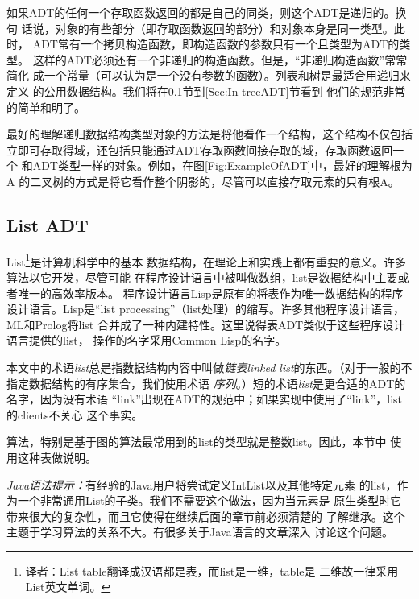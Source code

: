 如果ADT的任何一个存取函数返回的都是自己的同类，则这个ADT是递归的。换句
话说，对象的有些部分（即存取函数返回的部分）和对象本身是同一类型。此时，
ADT常有一个拷贝构造函数，即构造函数的参数只有一个且类型为ADT的类型。
这样的ADT必须还有一个非递归的构造函数。但是，“非递归构造函数”常常简化
成一个常量（可以认为是一个没有参数的函数）。列表和树是最适合用递归来定义
的公用数据结构。我们将在\ref{Sec:ListADT}节到\ref{Sec:In-treeADT}节看到
他们的规范非常的简单和明了。

最好的理解递归数据结构类型对象的方法是将他看作一个结构，这个结构不仅包括
立即可存取得域，还包括只能通过ADT存取函数间接存取的域，存取函数返回一个
和ADT类型一样的对象。例如，在图\ref{Fig:ExampleOfADT}中，最好的理解根为A
的二叉树的方式是将它看作整个阴影的，尽管可以直接存取元素的只有根A。

\subsection{List ADT}\label{Sec:ListADT}
List\footnote{译者：List table翻译成汉语都是表，而list是一维，table是
二维故一律采用List英文单词。}是计算机科学中的基本
数据结构，在理论上和实践上都有重要的意义。许多算法以它开发，尽管可能
在程序设计语言中被叫做数组，list是数据结构中主要或者唯一的高效率版本。
程序设计语言Lisp是原有的将表作为唯一数据结构的程序设计语言。Lisp是“list
processing”（list处理）的缩写。许多其他程序设计语言，ML和Prolog将list
合并成了一种内建特性。这里说得表ADT类似于这些程序设计语言提供的list，
操作的名字采用Common Lisp的名字。

本文中的术语\emph{list}总是指数据结构内容中叫做\emph{链表linked
list}的东西。（对于一般的不指定数据结构的有序集合，我们使用术语
\emph{序列}。）短的术语\emph{list}是更合适的ADT的名字，因为没有术语
“link”出现在ADT的规范中；如果实现中使用了“link”，list的clients不关心
这个事实。

算法，特别是基于图的算法最常用到的list的类型就是整数list。因此，本节中
使用这种表做说明。

\textit{Java语法提示：}有经验的Java用户将尝试定义IntList以及其他特定元素
的list，作为一个非常通用List的子类。我们不需要这个做法，因为当元素是
原生类型时它带来很大的复杂性，而且它使得在继续后面的章节前必须清楚的
了解继承。这个主题于学习算法的关系不大。有很多关于Java语言的文章深入
讨论这个问题。

